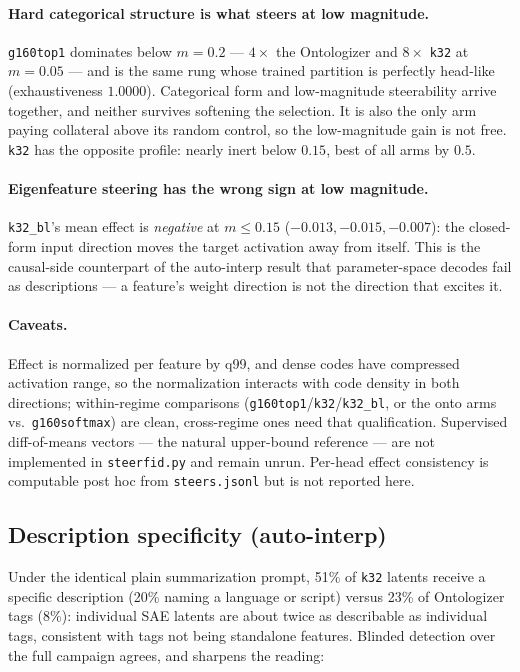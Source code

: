 \documentclass[11pt]{article}
\begin{document}
\paragraph{Hard categorical structure is what steers at low magnitude.}
\texttt{g160top1} dominates below $m{=}0.2$ --- $4\times$ the Ontologizer
and $8\times$ \texttt{k32} at $m{=}0.05$ --- and is the same rung whose
trained partition is perfectly head-like (exhaustiveness $1.0000$).
Categorical form and low-magnitude steerability arrive together, and
neither survives softening the selection. It is also the only arm paying
collateral above its random control, so the low-magnitude gain is not free.
\texttt{k32} has the opposite profile: nearly inert below $0.15$, best of
all arms by $0.5$.

\paragraph{Eigenfeature steering has the wrong sign at low magnitude.}
\texttt{k32\_bl}'s mean effect is \emph{negative} at $m \le 0.15$
($-0.013, -0.015, -0.007$): the closed-form input direction moves the
target activation away from itself. This is the causal-side counterpart of
the auto-interp result that parameter-space decodes fail as descriptions
--- a feature's weight direction is not the direction that excites it.

\paragraph{Caveats.} Effect is normalized per feature by q99, and dense
codes have compressed activation range, so the normalization interacts
with code density in both directions; within-regime comparisons
(\texttt{g160top1}/\texttt{k32}/\texttt{k32\_bl}, or the onto arms vs.\
\texttt{g160softmax}) are clean, cross-regime ones need that
qualification. Supervised diff-of-means vectors --- the natural upper-bound
reference --- are not implemented in \texttt{steerfid.py} and remain
unrun. Per-head effect consistency is computable post hoc from
\texttt{steers.jsonl} but is not reported here.

\subsection{Description specificity (auto-interp)}

Under the identical plain summarization prompt, 51\% of \texttt{k32}
latents receive a specific description (20\% naming a language or
script) versus 23\% of Ontologizer tags (8\%): individual SAE latents
are about twice as describable as individual tags, consistent with tags
not being standalone features. Blinded detection over the full campaign
agrees, and sharpens the reading:
\end{document}
